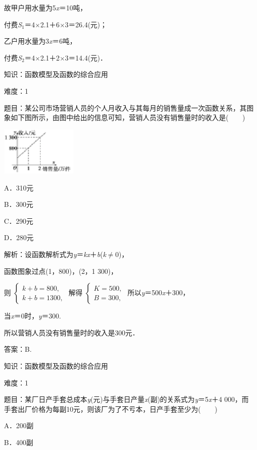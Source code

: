 \documentclass{article} %
\begin{document}
故甲户用水量为5\textit{x}＝10吨，

付费\textit{S}${}_{1}$＝4$\mathrm{\times}$2.1＋6$\mathrm{\times}$3＝26.4(元)；

乙户用水量为3\textit{x}＝6吨，

付费\textit{S}${}_{2}$＝4$\mathrm{\times}$2.1＋2$\mathrm{\times}$3＝14.4(元)．

知识：函数模型及函数的综合应用

难度：1

题目：某公司市场营销人员的个人月收入与其每月的销售量成一次函数关系，其图象如下图所示，由图中给出的信息可知，营销人员没有销售量时的收入是(　　)

\includegraphics*[width=1.47in, height=0.93in, keepaspectratio=false]{image79}

A．310元　　

B．300元　

C．290元　　

D．280元

解析：设函数解析式为\textit{y}＝\textit{kx}＋\textit{b}(\textit{k}$\mathrm{\neq}$0)，

函数图象过点(1，800)，(2，1 300)，

则
$\left\{
\begin{array}{l}
k+b=800,\\
k+b=1300,
\end{array}
\right.$
解得
$\left\{
\begin{array}{l}
K=500,\\
B=300,
\end{array}
\right.$
所以\textit{y}＝500\textit{x}＋300，

当\textit{x}＝0时，\textit{y}＝300.

所以营销人员没有销售量时的收入是300元．

答案：B.

知识：函数模型及函数的综合应用

难度：1

题目：某厂日产手套总成本\textit{y}(元)与手套日产量\textit{x}(副)的关系式为\textit{y}＝5\textit{x}＋4 000，而手套出厂价格为每副10元，则该厂为了不亏本，日产手套至少为(　　)

A．200副　　　　　 

B．400副
\end{document}
